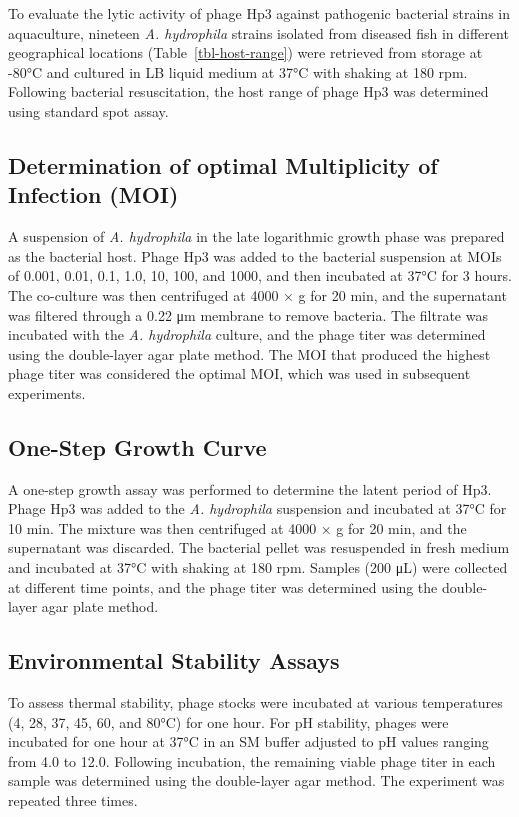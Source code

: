 To evaluate the lytic activity of phage Hp3 against pathogenic bacterial
strains in aquaculture, nineteen \emph{A. hydrophila} strains isolated
from diseased fish in different geographical locations
(Table~\ref{tbl-host-range}) were retrieved from storage at -80°C and
cultured in LB liquid medium at 37°C with shaking at 180 rpm. Following
bacterial resuscitation, the host range of phage Hp3 was determined
using standard spot assay.

\subsection{Determination of optimal Multiplicity of Infection
(MOI)}\label{determination-of-optimal-multiplicity-of-infection-moi}

A suspension of \emph{A. hydrophila} in the late logarithmic growth
phase was prepared as the bacterial host. Phage Hp3 was added to the
bacterial suspension at MOIs of 0.001, 0.01, 0.1, 1.0, 10, 100, and 1000,
and then incubated at 37°C for 3 hours. The co-culture was then
centrifuged at 4000 × g for 20 min, and the supernatant was filtered
through a 0.22 μm membrane to remove bacteria. The filtrate was
incubated with the \emph{A. hydrophila} culture, and the phage titer was
determined using the double-layer agar plate method. The MOI that
produced the highest phage titer was considered the optimal MOI, which
was used in subsequent experiments.

\subsection{One-Step Growth Curve}\label{one-step-growth-curve}

A one-step growth assay was performed to determine the latent period
of Hp3. Phage Hp3 was added to the \emph{A. hydrophila} suspension and
incubated at 37°C for 10 min. The mixture was then centrifuged at 4000 ×
g for 20 min, and the supernatant was discarded. The bacterial pellet
was resuspended in fresh medium and incubated at 37°C with shaking at
180 rpm. Samples (200 μL) were collected at different time points, and
the phage titer was determined using the double-layer agar plate method.

\subsection{Environmental Stability
Assays}\label{environmental-stability-assays}

To assess thermal stability, phage stocks were incubated at various
temperatures (4, 28, 37, 45, 60, and 80°C) for one hour. For pH
stability, phages were incubated for one hour at 37°C in an SM buffer
adjusted to pH values ranging from 4.0 to 12.0. Following incubation,
the remaining viable phage titer in each sample was determined using the
double-layer agar method. The experiment was repeated three times.


